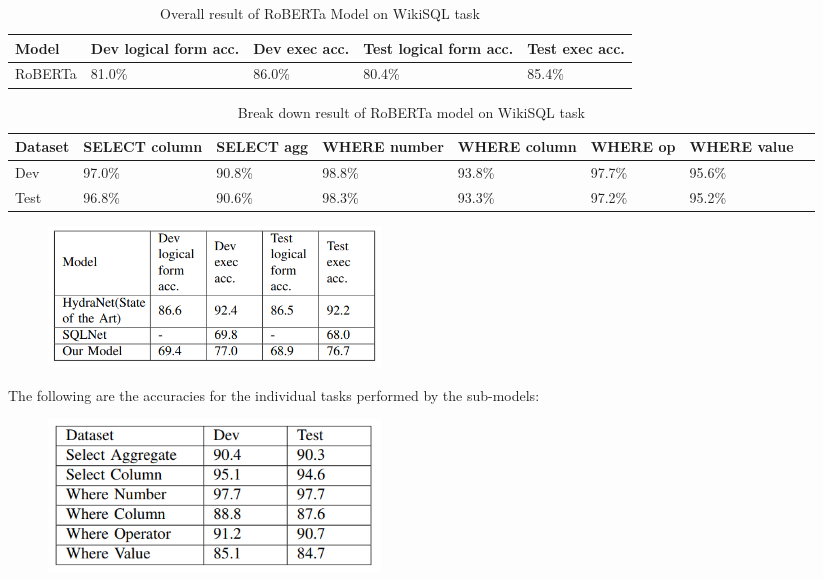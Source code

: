 \documentclass[12pt]{article}
\begin{document}
 \begin{table}
\centering
 \begin{tabular}{| m{2cm} | m{2cm}| m{2cm} |m{2cm}| m{2cm} |} 
 \hline
Model & Dev logical form acc. & Dev exec acc. & Test logical form acc. & Test exec acc. \\ 
 \hline\hline
  RoBERTa & 81.0\% & 86.0\% & 80.4\% & 85.4\% \\ 
 \hline
\end{tabular}
\caption{Overall result of RoBERTa Model on WikiSQL task}
\label{robertatableoneheader}
\end{table}


\begin{table}
\centering
 \begin{tabular}{| m{2cm} | m{2cm}| m{2cm} |m{2cm}| m{2cm} |m{2cm} | m{2cm} |m{2cm} |} 
 \hline
  Dataset & SELECT column & SELECT agg & WHERE number & WHERE column & WHERE op & WHERE value\\ 
 \hline\hline
  Dev & 97.0\% & 90.8\% & 98.8\% & 93.8\% & 97.7\% &  95.6\% \\ 
\hline
 Test & 96.8\% & 90.6\% & 98.3\% & 93.3\% & 97.2\% &  95.2\% \\ 
 \hline

\end{tabular}
\caption{Break down result of RoBERTa model on WikiSQL task}
\label{robertatabledetailedoneheader}
\end{table}







\begin{figure}[H]
    \includegraphics[width=250pt]{result1}
    \label{fig:Model Architecture}
\end{figure}

The following are the accuracies for the individual tasks
performed by the sub-models:

\begin{figure}[H]
    \includegraphics[width=250pt]{result2}
    \label{fig:Model Architecture}
\end{figure}
\end{document}
